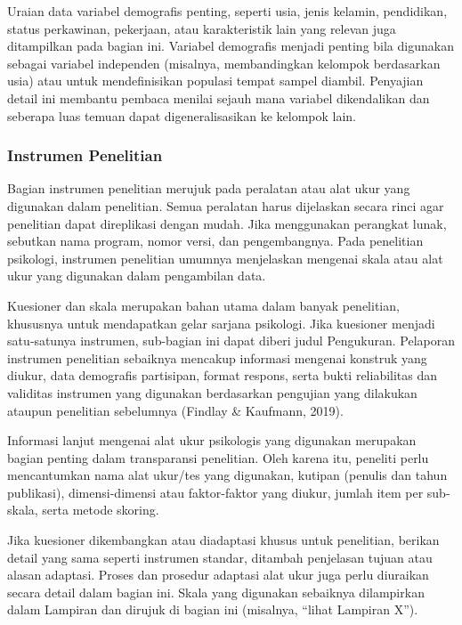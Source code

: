 \documentclass[
  indonesian,
  letterpaper,
  DIV=11,
  numbers=noendperiod]{scrreprt}
\begin{document}
Uraian data variabel demografis penting, seperti usia, jenis kelamin,
pendidikan, status perkawinan, pekerjaan, atau karakteristik lain yang
relevan juga ditampilkan pada bagian ini. Variabel demografis menjadi
penting bila digunakan sebagai variabel independen (misalnya,
membandingkan kelompok berdasarkan usia) atau untuk mendefinisikan
populasi tempat sampel diambil. Penyajian detail ini membantu pembaca
menilai sejauh mana variabel dikendalikan dan seberapa luas temuan dapat
digeneralisasikan ke kelompok lain.

\subsubsection{Instrumen Penelitian}\label{instrumen-penelitian-1}

Bagian instrumen penelitian merujuk pada peralatan atau alat ukur yang
digunakan dalam penelitian. Semua peralatan harus dijelaskan secara
rinci agar penelitian dapat direplikasi dengan mudah. Jika menggunakan
perangkat lunak, sebutkan nama program, nomor versi, dan pengembangnya.
Pada penelitian psikologi, instrumen penelitian umumnya menjelaskan
mengenai skala atau alat ukur yang digunakan dalam pengambilan data.

Kuesioner dan skala merupakan bahan utama dalam banyak penelitian,
khususnya untuk mendapatkan gelar sarjana psikologi. Jika kuesioner
menjadi satu‑satunya instrumen, sub-bagian ini dapat diberi judul
Pengukuran. Pelaporan instrumen penelitian sebaiknya mencakup informasi
mengenai konstruk yang diukur, data demografis partisipan, format
respons, serta bukti reliabilitas dan validitas instrumen yang digunakan
berdasarkan pengujian yang dilakukan ataupun penelitian sebelumnya
(Findlay \& Kaufmann, 2019).

Informasi lanjut mengenai alat ukur psikologis yang digunakan merupakan
bagian penting dalam transparansi penelitian. Oleh karena itu, peneliti
perlu mencantumkan nama alat ukur/tes yang digunakan, kutipan (penulis
dan tahun publikasi), dimensi-dimensi atau faktor-faktor yang diukur,
jumlah item per sub-skala, serta metode skoring.

Jika kuesioner dikembangkan atau diadaptasi khusus untuk penelitian,
berikan detail yang sama seperti instrumen standar, ditambah penjelasan
tujuan atau alasan adaptasi. Proses dan prosedur adaptasi alat ukur juga
perlu diuraikan secara detail dalam bagian ini. Skala yang digunakan
sebaiknya dilampirkan dalam Lampiran dan dirujuk di bagian ini
(misalnya, ``lihat Lampiran X'').
\end{document}
